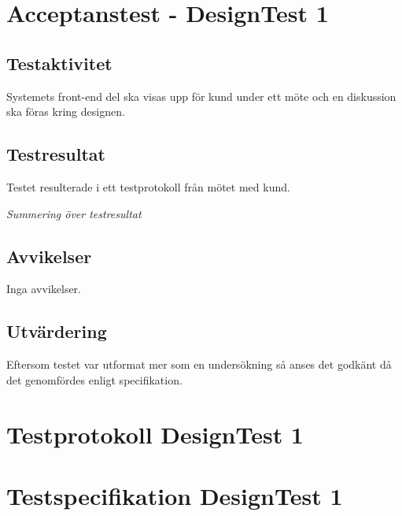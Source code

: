 \section{Acceptanstest - DesignTest 1}
\subsection{Testaktivitet}
    Systemets front-end del ska visas upp för kund under ett möte och en diskussion ska föras kring designen.


\subsection{Testresultat}
    Testet resulterade i ett testprotokoll från mötet med kund.

\emph{Summering över testresultat}
\subsection{Avvikelser}
    Inga avvikelser.
\subsection{Utvärdering}
    Eftersom testet var utformat mer som en undersökning så anses det godkänt då det genomfördes enligt specifikation.

\clearpage
\appendix
\section{Testprotokoll DesignTest 1}

\section{Testspecifikation DesignTest 1}

